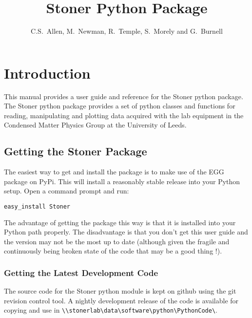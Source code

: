 \documentclass[a4paper,11pt]{scrartcl}
\author{C.S.~Allen, M.~Newman, R.~Temple, S.~Morely  and G.~Burnell}
\title{Stoner Python Package}
\begin{document}
\maketitle

\tableofcontents
\newpage
\pagestyle{scrheadings} 
\ifoot[\today]{\today}



  \section{Introduction}

This manual provides a user guide and reference for the Stoner python package.
The Stoner python package provides a set of python classes and functions for
reading, manipulating and plotting data acquired with the lab equipment in the
Condensed Matter Physics Group at the University of Leeds.

\subsection{Getting the Stoner Package}

The easiest way to get and install the package is to make use of the EGG
package on PyPi. This will install a reasonably stable release into your
Python setup. Open a command prompt and run:

\begin{verbatim}
easy_install Stoner
\end{verbatim}

The advantage of getting the package this way is that it is installed into your Python path properly.
The disadvantage is that you don't get this user guide and the version may not be the most
up to date (although given the fragile and continuously being broken state of the code that may be
a good thing !).

\subsubsection{Getting the Latest Development Code}


The source code for the Stoner python module is kept on github using the git
revision control tool. A nightly development release of the code is available for copying and
use in \verb#\\stonerlab\data\software\python\PythonCode\#.
\end{document}
